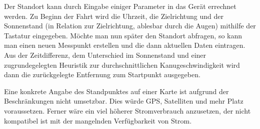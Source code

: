 \documentclass[a4paper,10pt]{scrartcl}
\begin{document}
Der Standort kann durch Eingabe einiger Parameter in das Gerät errechnet werden. Zu Beginn der Fahrt wird die Uhrzeit, die Zielrichtung und der Sonnenstand (in Relation zur Zielrichtung, ablesbar durch die Augen) mithilfe der Tastatur eingegeben. Möchte man nun später den Standort abfragen, so kann man einen neuen Messpunkt erstellen und die dann aktuellen Daten eintragen. Aus der Zeitdifferenz, dem Unterschied im Sonnenstand und einer zugrundegelegten Heuristik zur durchschnittlichen Kanugeschwindigkeit wird dann die zurückgelegte Entfernung zum Startpunkt ausgegeben.

Eine konkrete Angabe des Standpunktes auf einer Karte ist aufgrund der Beschränkungen nicht umsetzbar. Dies würde GPS, Satelliten und mehr Platz voraussetzen. Ferner wäre ein viel höherer Stromverbrauch anzusetzen, der nicht kompatibel ist mit der mangelnden Verfügbarkeit von Strom.
\end{document}
